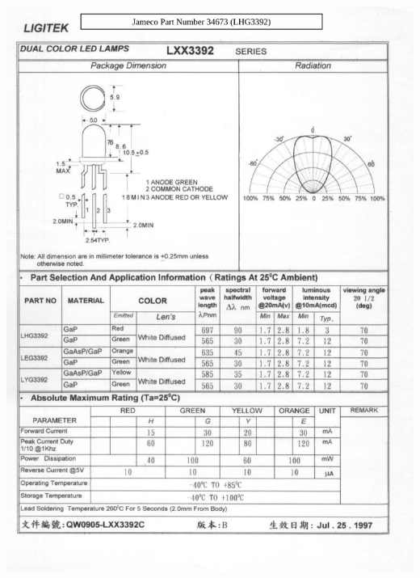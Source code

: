 \documentclass[12pt]{article}
\begin{document}
\includegraphics[width=\textwidth]{../Appendix/Figures/Main-Unit/LED Datasheet.png}
\end{document}

